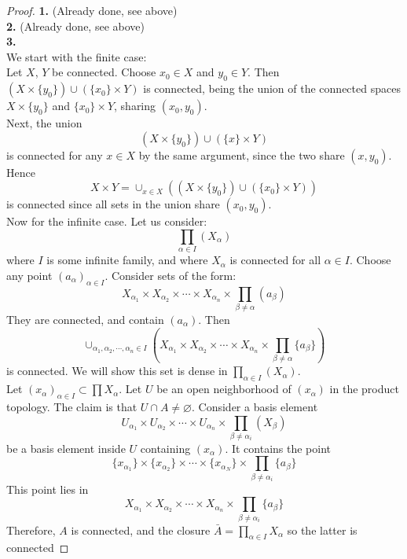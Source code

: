 \documentclass{article}
\begin{document}
\begin{proof}
	\textbf{1.} (Already done, see above) \\
	\textbf{2.} (Already done, see above) \\
	\textbf{3.}\\
	We start with the finite case:\\Let $X$, $Y$ be connected. Choose $x_0\in X$ and $y_0\in Y$.  Then $(X\times \{y_0\})\cup(\{x_0\}\times{Y})$ is connected, being the union of the connected spaces $X\times\{y_0\}$ and $\{x_0\}\times{Y}$, sharing $(x_0,y_0)$.\\Next, the union
	\begin{equation*}
	(X\times\{y_0\})\cup(\{x\}\times{Y})
	\end{equation*}
	is connected for any $x\in X$ by the same argument, since the two share $(x,y_0)$.  Hence
	\begin{equation*}
	X\times Y = \cup_{x\in X}((X\times\{y_0\})\cup(\{x_0\}\times{Y}))
	\end{equation*}
	is connected since all sets in the union share $(x_0,y_0)$.\\Now for the infinite case.   Let us consider:\\
	\begin{equation*}
	\prod_{\alpha\in I}(X_\alpha)
	\end{equation*} where $I$ is some infinite family, and where $X_\alpha$ is connected for all $\alpha\in I$.  Choose any point $(a_\alpha)_{\alpha\in I}$.  Consider sets of the form:
	\begin{equation*}
	X_{\alpha_1}\times{}X_{\alpha_2}\times\cdots\times X_{\alpha_n}\times \prod_{\beta\neq\alpha}(a_\beta)
	\end{equation*}
	They are connected, and contain $(a_\alpha)$.  Then
	\begin{equation*}
	\cup_{\alpha_1,\alpha_2,\cdots,\alpha_n\in I}(X_{\alpha_1}\times X_{\alpha_2}\times\cdots\times X_{\alpha_n}\times\prod_{\beta\neq\alpha}\{a_\beta\})
	\end{equation*}
	is connected.  We will show this set is dense in $\prod_{\alpha\in I}(X_\alpha)$.\\
	Let $(x_\alpha)_{\alpha\in I} \subset \prod X_\alpha$.  Let $U$ be an open neighborhood of $(x_\alpha)$ in the product topology.  The claim is that $U\cap A\neq\varnothing$.  Consider a basis element 
	\begin{equation*}
	U_{\alpha_1}\times U_{\alpha_2}\times\cdots\times U_{\alpha_n}\times\prod_{\beta\neq\alpha_i}(X_\beta)
	\end{equation*}
	be a basis element inside $U$ containing $(x_\alpha)$.  It contains the point
	\begin{equation*}
	\{x_{\alpha_1}\}\times\{x_{\alpha_2}\}\times\cdots\times\{x_{\alpha_N}\}\times\prod_{\beta\neq\alpha_i}\{a_\beta\}
	\end{equation*}  This point lies in
	\begin{equation*}
	X_{\alpha_1}\times X_{\alpha_2}\times\cdots\times X_{\alpha_n}\times\prod_{\beta\neq\alpha_i}\{a_\beta\}
	\end{equation*}
	Therefore, $A$ is connected, and the closure $\bar{A} = \prod_{\alpha\in I}X_\alpha$ so the latter is connected
\end{proof}
\end{document}
